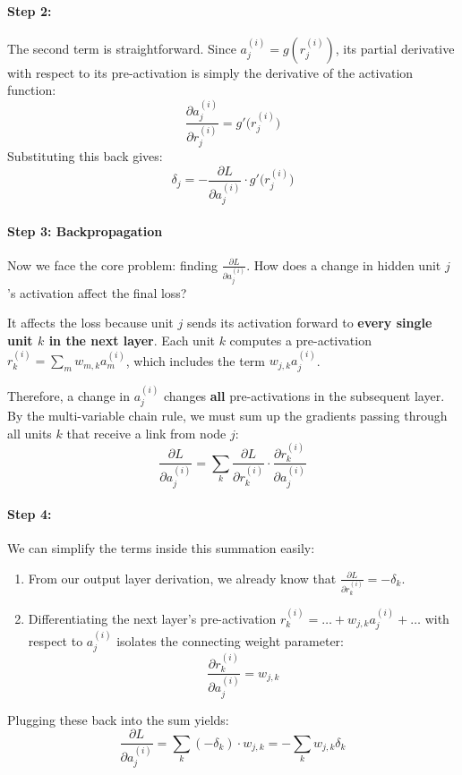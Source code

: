 \paragraph{Step 2:}
The second term is straightforward. Since $a_j^{(i)} = g(r_j^{(i)})$, its partial derivative with respect to its pre-activation is simply the derivative of the activation function:
\[
\frac{\partial a_j^{(i)}}{\partial r_j^{(i)}} = g'\big(r_j^{(i)}\big)
\]
Substituting this back gives:
\[
\delta_j = -\frac{\partial L}{\partial a_j^{(i)}} \cdot g'\big(r_j^{(i)}\big)
\]

\paragraph{Step 3: Backpropagation}
Now we face the core problem: finding $\frac{\partial L}{\partial a_j^{(i)}}$. How does a change in hidden unit $j$'s activation affect the final loss? 

It affects the loss because unit $j$ sends its activation forward to \textbf{every single unit $k$ in the next layer}. Each unit $k$ computes a pre-activation $r_k^{(i)} = \sum_{m} w_{m,k} a_m^{(i)}$, which includes the term $w_{j,k} a_j^{(i)}$. 

Therefore, a change in $a_j^{(i)}$ changes \textbf{all} pre-activations in the subsequent layer. By the multi-variable chain rule, we must sum up the gradients passing through all units $k$ that receive a link from node $j$:
\[
\frac{\partial L}{\partial a_j^{(i)}} = \sum_{k} \frac{\partial L}{\partial r_k^{(i)}} \cdot \frac{\partial r_k^{(i)}}{\partial a_j^{(i)}}
\]



\paragraph{Step 4:}
We can simplify the terms inside this summation easily:
\begin{enumerate}
    \item From our output layer derivation, we already know that $\frac{\partial L}{\partial r_k^{(i)}} = -\delta_k$.
    \item Differentiating the next layer's pre-activation $r_k^{(i)} = \dots + w_{j,k} a_j^{(i)} + \dots$ with respect to $a_j^{(i)}$ isolates the connecting weight parameter:
    \[
    \frac{\partial r_k^{(i)}}{\partial a_j^{(i)}} = w_{j,k}
    \]
\end{enumerate}

Plugging these back into the sum yields:
\[
\frac{\partial L}{\partial a_j^{(i)}} = \sum_{k} (-\delta_k) \cdot w_{j,k} = -\sum_{k} w_{j,k} \delta_k
\]

